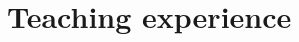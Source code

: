 \documentclass[11pt,a4paper]{article}
\newcommand{\years}[1]{\marginnote{\small #1}}
\begin{document}



\section*{Teaching experience}
\end{document}
